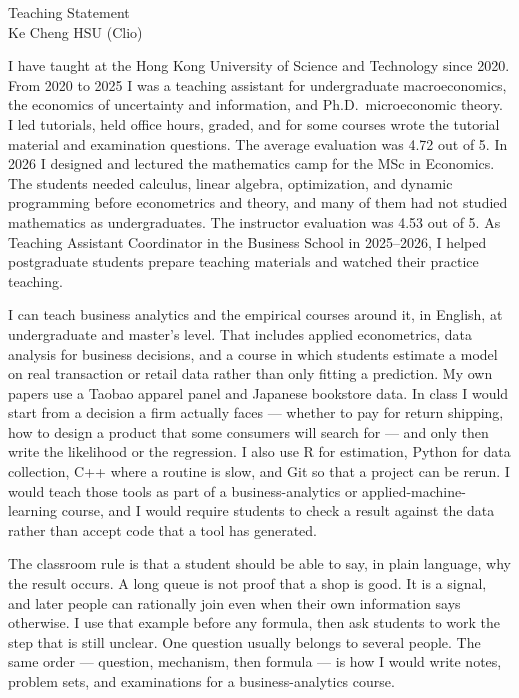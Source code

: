 \documentclass[11pt]{article}
\begin{document}
\begin{center}
{\Large Teaching Statement}\\[0.3em]
Ke Cheng HSU (Clio)
\end{center}

I have taught at the Hong Kong University of Science and Technology since 2020. From 2020 to 2025 I was a teaching assistant for undergraduate macroeconomics, the economics of uncertainty and information, and Ph.D.\ microeconomic theory. I led tutorials, held office hours, graded, and for some courses wrote the tutorial material and examination questions. The average evaluation was 4.72 out of 5. In 2026 I designed and lectured the mathematics camp for the MSc in Economics. The students needed calculus, linear algebra, optimization, and dynamic programming before econometrics and theory, and many of them had not studied mathematics as undergraduates. The instructor evaluation was 4.53 out of 5. As Teaching Assistant Coordinator in the Business School in 2025--2026, I helped postgraduate students prepare teaching materials and watched their practice teaching.

I can teach business analytics and the empirical courses around it, in English, at undergraduate and master's level. That includes applied econometrics, data analysis for business decisions, and a course in which students estimate a model on real transaction or retail data rather than only fitting a prediction. My own papers use a Taobao apparel panel and Japanese bookstore data. In class I would start from a decision a firm actually faces --- whether to pay for return shipping, how to design a product that some consumers will search for --- and only then write the likelihood or the regression. I also use R for estimation, Python for data collection, C++ where a routine is slow, and Git so that a project can be rerun. I would teach those tools as part of a business-analytics or applied-machine-learning course, and I would require students to check a result against the data rather than accept code that a tool has generated.

The classroom rule is that a student should be able to say, in plain language, why the result occurs. A long queue is not proof that a shop is good. It is a signal, and later people can rationally join even when their own information says otherwise. I use that example before any formula, then ask students to work the step that is still unclear. One question usually belongs to several people. The same order --- question, mechanism, then formula --- is how I would write notes, problem sets, and examinations for a business-analytics course.
\end{document}
